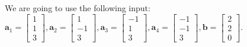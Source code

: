 \documentclass[preview]{standalone}
\renewcommand{\vec}{\mathbf}
\begin{document}
\begin{center}
We are going to use the following input:\\$\vec{a}_1=\begin{bmatrix}1\\1\\3\end{bmatrix},\vec{a}_2=\begin{bmatrix}1\\-1\\3\end{bmatrix},\vec{a}_3=\begin{bmatrix}-1\\1\\3\end{bmatrix},\vec{a}_4=\begin{bmatrix}-1\\-1\\3\end{bmatrix},\vec{b}=\begin{bmatrix}2\\2\\0\end{bmatrix}.$
\end{center}
\end{document}
